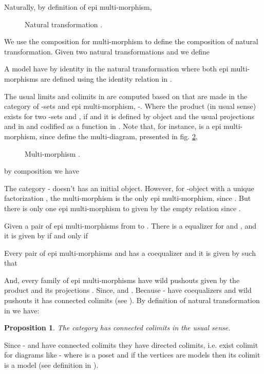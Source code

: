 \documentclass[oribibl]{llncs}
\newtheorem{prop}{Proposition}
\begin{document}
Naturally, by definition of epi multi-morphism,  

\begin{figure}[h]

\caption{Natural transformation .}\label{naturaltransf}
\end{figure}

 We use the composition for multi-morphism to define the composition of natural transformation. Given two natural transformations  and  we define

A model  have by identity in  the natural transformation  where both epi multi-morphisms are defined using the identity relation in .

The usual limits and colimits in  are computed based on that are made in the category of -sets and epi multi-morphism, -. Where the product (in usual sense) exists for two -sets  and , if
and it is defined by object  and the usual projections  and  in  and codified as a function in . Note that, for instance,  is a epi multi-morphism, since  define the multi-diagram, presented in fig. \ref{product},

\begin{figure}[h]

\caption{Multi-morphism .}\label{product}
\end{figure}

by composition we have




 The category - doesn't has an initial object. However, for -object  with a unique factorization , the multi-morphism   is the only epi multi-morphism, since . But there is only one epi multi-morphism to  given by the empty relation  since .

 Given a pair of epi multi-morphisms  from  to . There is a equalizer for  and , and it is given by  if and only if
 
Every pair of epi multi-morphisms  and  has a coequalizer and it is given by  such that

And, every family  of epi multi-morphisms have wild pushouts given by the product  and its projections . Since,  and . Because - have coequalizers and  wild pushouts it has connected colimits (see \cite{Borceux94}). By definition of natural transformation in  we have:

\begin{prop}
The category  has connected colimits in the usual sense.  \end{prop}

Since - and  have connected colimits they have directed colimits, i.e. exist colimit for diagrams like -  where  is a poset and if the vertices are models then its colimit is a model (see definition in \cite{Adamek94}).
\end{document}
